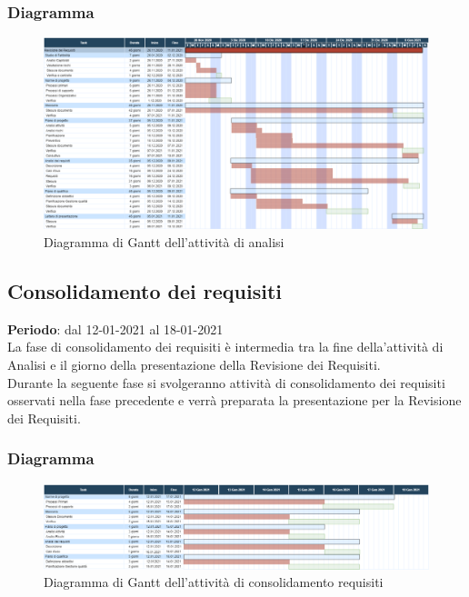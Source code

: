 	\subsubsection{Diagramma}
		\begin{figure}[H]
        		\centering
        		\includegraphics[width=\textwidth]{source/img/analisiattivita.png}
        		\caption{Diagramma di Gantt dell'attività di analisi}
    		\end{figure}

	\subsection{Consolidamento dei requisiti}
	\textbf{Periodo}: dal 12-01-2021 al 18-01-2021 \\
	La fase di consolidamento dei requisiti è intermedia tra la fine della'attività di Analisi e il giorno della presentazione della Revisione dei Requisiti. \\
	Durante la seguente fase si svolgeranno attività di consolidamento dei requisiti osservati nella fase precedente e verrà preparata la presentazione per la Revisione dei Requisiti.
	
	\subsubsection{Diagramma}
		\begin{figure}[H]
        		\centering
        		\includegraphics[width=\textwidth]{source/img/Consolidamento_Requisiti.png}
        		\caption{Diagramma di Gantt dell'attività di consolidamento requisiti}
    		\end{figure}
	
